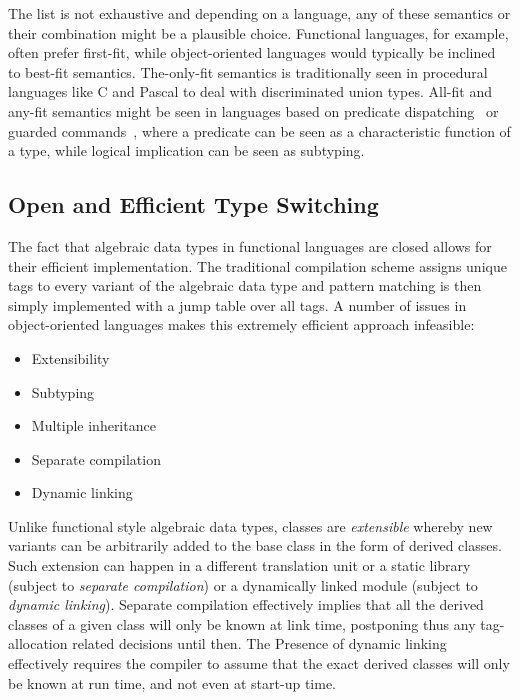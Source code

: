 \documentclass[preprint]{sigplanconf}
\begin{document}
\noindent
The list is not exhaustive and depending on a language, any of these semantics 
or their combination might be a plausible choice. Functional languages, for 
example, often prefer first-fit, while object-oriented languages would typically 
be inclined to best-fit semantics. The-only-fit semantics is traditionally seen 
in procedural languages like C and Pascal to deal with discriminated union types. 
All-fit and any-fit semantics might be seen in languages based on predicate 
dispatching~\cite{ErnstKC98} or guarded commands~\cite{EWD:EWD472}, where a 
predicate can be seen as a characteristic function of a type, while logical 
implication can be seen as subtyping.

\subsection{Open and Efficient Type Switching}
\label{sec:poets}

The fact that algebraic data types in functional languages are closed allows for 
their efficient implementation. The traditional compilation scheme assigns unique 
tags to every variant of the algebraic data type and pattern matching is then 
simply implemented with a jump table over all tags. A number of issues in 
object-oriented languages makes this extremely efficient approach infeasible:

\begin{itemize}
\setlength{\itemsep}{0pt}
\setlength{\parskip}{0pt}
\item Extensibility
\item Subtyping
\item Multiple inheritance
\item Separate compilation
\item Dynamic linking 
\end{itemize}

\noindent
Unlike functional style algebraic data types, classes are \emph{extensible} 
whereby new variants can be arbitrarily added to the base class in the form of 
derived classes. Such extension can happen in a different translation unit or a
static library (subject to \emph{separate compilation}) or a dynamically linked 
module (subject to \emph{dynamic linking}). Separate compilation effectively 
implies that all the derived classes of a given class will only be known at link 
time, postponing thus any tag-allocation related decisions until then. The 
Presence of dynamic linking effectively requires the compiler to assume that the 
exact derived classes will only be known at run time, and not even at start-up 
time.
\end{document}
